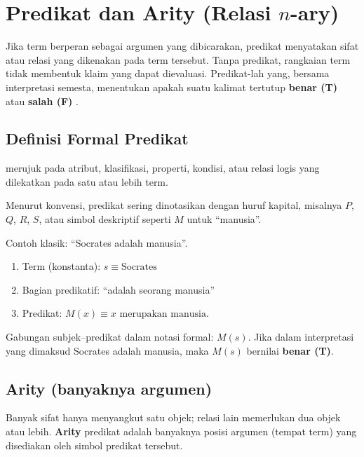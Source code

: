 \section{Predikat dan Arity (Relasi $n$-ary)}

Jika term berperan sebagai argumen yang dibicarakan, predikat menyatakan sifat atau relasi yang dikenakan pada term tersebut. Tanpa predikat, rangkaian term tidak membentuk klaim yang dapat dievaluasi. Predikat-lah yang, bersama interpretasi semesta, menentukan apakah suatu kalimat tertutup \textbf{benar (T)} atau \textbf{salah (F)} \cite{rosen2019}.

\subsection{Definisi Formal Predikat}

\begin{definisi}[Predikat]
 merujuk pada atribut, klasifikasi, properti, kondisi, atau relasi logis yang dilekatkan pada satu atau lebih term.
\end{definisi}

Menurut konvensi, predikat sering dinotasikan dengan huruf kapital, misalnya $P$, $Q$, $R$, $S$, atau simbol deskriptif seperti $M$ untuk ``manusia''.

\begin{contoh}
Contoh klasik: ``Socrates adalah manusia''.
\begin{enumerate}
    \item Term (konstanta): $s \equiv \text{Socrates}$
    \item Bagian predikatif: ``adalah seorang manusia''
    \item Predikat: $M(x) \equiv x \text{ merupakan manusia}$.
\end{enumerate}

Gabungan subjek--predikat dalam notasi formal: $M(s)$. Jika dalam interpretasi yang dimaksud Socrates adalah manusia, maka $M(s)$ bernilai \textbf{benar (T)}.
\end{contoh}

\subsection{Arity (banyaknya argumen)}

Banyak sifat hanya menyangkut satu objek; relasi lain memerlukan dua objek atau lebih. \textbf{Arity} predikat adalah banyaknya posisi argumen (tempat term) yang disediakan oleh simbol predikat tersebut.

